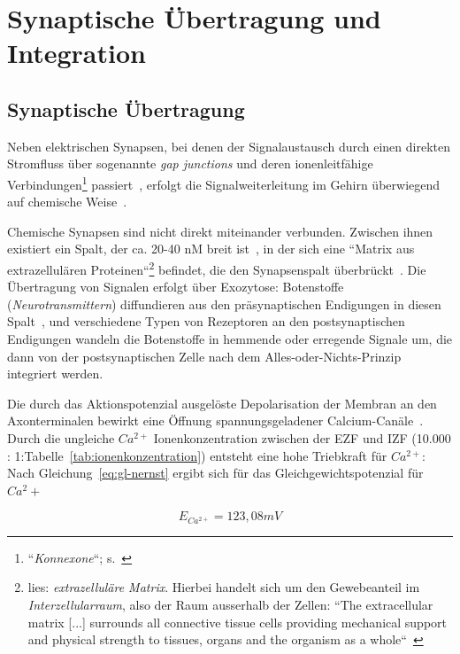 {{{\vskip 1.6in


\pagebreak

\section{Synaptische Übertragung und Integration}


\subsection{Synaptische Übertragung}\label{synaptischeuebertragung}
Neben elektrischen Synapsen, bei denen der Signalaustausch durch einen direkten Stromfluss über sogenannte \textit{gap junctions} und deren ionenleitfähige Verbindungen\footnote{
 ``\textit{Konnexone}``; s.~\cite[50]{SD07}
} passiert~\cite[119]{BCP18}, erfolgt die Signalweiterleitung im Gehirn überwiegend auf chemische Weise~\cite[121 ff.]{BCP18}.

Chemische Synapsen sind nicht direkt miteinander verbunden. 
Zwischen ihnen existiert ein Spalt, der ca. 20-40 nM breit ist~\cite[184]{KSJ+13}, in der sich eine ``Matrix aus extrazellulären Proteinen``\footnote{
 lies: \textit{extrazelluläre Matrix}. Hierbei handelt sich um den Gewebeanteil im \textit{Interzellularraum}, also der Raum ausserhalb der Zellen: ``The extracellular matrix {[...]} surrounds all connective tissue cells providing mechanical support and physical strength to tissues, organs and the organism as a whole``~\cite[3]{AHH+98}
} befindet, die den Synapsenspalt überbrückt~\cite[122]{BCP18}.
Die Übertragung von Signalen erfolgt über Exozytose: Botenstoffe (\textit{Neurotransmittern}) diffundieren aus den präsynaptischen Endigungen in diesen Spalt~\cite[122]{BCP18}, und verschiedene Typen von Rezeptoren an den postsynaptischen Endigungen wandeln die Botenstoffe in hemmende oder erregende Signale um, die dann von der postsynaptischen Zelle nach dem Alles-oder-Nichts-Prinzip integriert werden.

Die durch das Aktionspotenzial ausgelöste Depolarisation der Membran an den Axonterminalen bewirkt eine Öffnung spannungsgeladener Calcium-Canäle~\cite[184]{KSJ+13}.
Durch die ungleiche $Ca^{2+}$ Ionenkonzentration zwischen der EZF und IZF (10.000 : 1:Tabelle~\ref{tab:ionenkonzentration}) entsteht eine hohe Triebkraft für $Ca^{2+}$: Nach Gleichung~\ref{eq:gl-nernst} ergibt sich für das Gleichgewichtspotenzial für $Ca^2+$

\begin{equation}
 E_{Ca^{2+}} = 123,08 mV
 \label{eq:gl-eqca2}
\end{equation}



}}}
